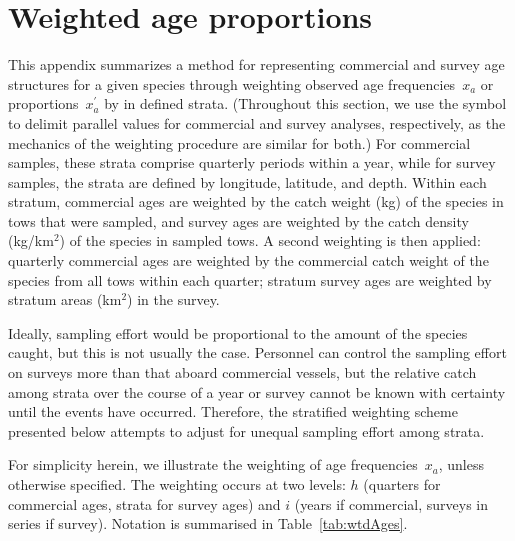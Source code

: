 \section{Weighted age proportions}

This appendix summarizes a method for representing commercial and survey age structures for a given species through weighting observed age frequencies~$x_a$ or proportions~$x^\prime_a$ by  in defined strata. 
(Throughout this section, we use the symbol \sQuote{$\Vert$} to delimit parallel values for commercial and survey analyses, respectively, as the mechanics of the weighting procedure are similar for both.) 
For commercial samples, these strata comprise quarterly periods within a year, while for survey samples, the strata are defined by longitude, latitude, and depth. 
Within each stratum, commercial ages are weighted by the catch weight (kg) of the species in tows that were sampled, and survey ages are weighted by the catch density (kg/km$^2$) of the species in sampled tows. 
A second weighting is then applied: quarterly commercial ages are weighted by the commercial catch weight of the species from all tows within each quarter; stratum survey ages are weighted by stratum areas (km$^2$) in the survey. 

Ideally, sampling effort would be proportional to the amount of the species caught, but this is not usually the case. 
Personnel can control the sampling effort on surveys more than that aboard commercial vessels, but the relative catch among strata over the course of a year or survey cannot be known with certainty until the events have occurred. 
Therefore, the stratified weighting scheme presented below attempts to adjust for unequal sampling effort among strata.

For simplicity herein, we illustrate the weighting of age frequencies~$x_a$, unless otherwise specified. 
The weighting occurs at two levels: $h$ (quarters for commercial ages, strata for survey ages) and $i$ (years if commercial, surveys in series if survey). 
Notation is summarised in Table~\ref{tab:wtdAges}.

